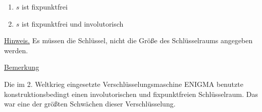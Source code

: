 \documentclass{uebungsblatt}
\begin{document}
\begin{aufgabe}
\begin{enumerate}
\begin{enumerate}
\item $s$ ist fixpunktfrei\\
\item $s$ ist fixpunktfrei und involutorisch \\
\end{enumerate}

\underline{Hinweis.} Es müssen die Schlüssel, nicht die Größe des
Schlüsselraums angegeben werden.

\end{enumerate}

\underline{Bemerkung}

\smallskip
Die im 2. Weltkrieg eingesetzte Verschlüsselungsmaschine ENIGMA
benutzte konstruktionsbedingt einen involutorischen und fixpunktfreien 
Schlüsselraum. Das war eine der größten Schwächen dieser Verschlüsselung.



\end{aufgabe}
\begin{loesung}

\end{loesung}
\end{document}
